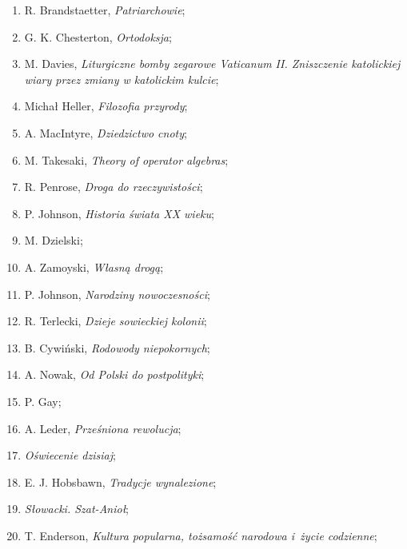 \documentclass[a4paper,11pt]{article}
\begin{document}
\begin{enumerate}
\item R. Brandstaetter, \textit{Patriarchowie};

\item G. K. Chesterton, \textit{Ortodoksja};

\item M. Davies, \textit{Liturgiczne bomby zegarowe Vaticanum II.
    Zniszczenie katolickiej wiary przez zmiany w katolickim kulcie};

\item Michał Heller, \textit{Filozofia przyrody};

\item A. MacIntyre, \textit{Dziedzictwo cnoty};

\item M. Takesaki, \textit{Theory of operator algebras};

\item R. Penrose, \textit{Droga do rzeczywistości};

\item P. Johnson, \textit{Historia świata XX wieku};

\item M. Dzielski;

\item A. Zamoyski, \textit{Własną drogą};

\item P. Johnson, \textit{Narodziny nowoczesności};

\item R. Terlecki, \textit{Dzieje sowieckiej kolonii};

\item B. Cywiński, \textit{Rodowody niepokornych};

\item A. Nowak, \textit{Od Polski do postpolityki};

\item P. Gay;

\item A. Leder, \textit{Prześniona rewolucja};

\item \textit{Oświecenie dzisiaj};

\item E. J. Hobsbawn, \textit{Tradycje wynalezione};

\item \textit{Słowacki. Szat-Anioł};

\item T. Enderson, \textit{Kultura popularna, tożsamość narodowa i~życie
    codzienne};


\end{enumerate}
\end{document}
